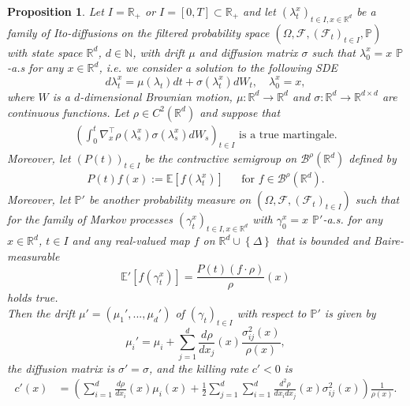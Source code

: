 \documentclass[a4paper,12pt]{article}
\newtheorem{proposition}[theorem]{Proposition}
\theoremstyle{definition}
\theoremstyle{remark}
\numberwithin{equation}{section}
\numberwithin{theorem}{section}
\begin{document}
\begin{proposition}
\label{prop:measure change gFs for Ito diffusions} Let $I=\mathbb{R}_{+}$
or $I=\left[ 0,T\right] \subset \mathbb{R}_{+}$ and let
$\left(\lambda_{t}^{x}\right)_{t\in I,x\in \mathbb{R}^{d}}$ be a family of Ito-diffusions on the filtered probability space $ \left(\Omega,\mathcal{F},\left(\mathcal{F}_{t}\right)_{t\in I},\mathbb{P}\right) $ with state space $\mathbb{R}^{d}$, $d\in\mathbb{N}$, with drift $\mu$ and diffusion matrix $\sigma$  such that $\lambda_{0}^{x}=x$
$\mathbb{P}$-a.s for any $x\in \mathbb{R}^{d}$, i.e. we consider a solution to the following SDE
\[
d\lambda_t^x= \mu(\lambda_t) dt + \sigma(\lambda_t^x) dW_t, \quad \lambda_0^x= x,
\]
where $W$ is a $d$-dimensional Brownian motion, $\mu: \mathbb{R}^d \to \mathbb{R}^d$ and $\sigma: \mathbb{R}^d \to \mathbb{R}^{d \times d}$ are continuous functions.
Let $\rho\in C^{2}(\mathbb{R}^{d})$ and suppose that
 \begin{align}\label{eq:martingale}
\left(\int_0^t  \nabla_x^{\top} \rho(\lambda_s^x) \sigma(\lambda_s^x) dW_s\right)_{t \in I} \text{ is a true martingale.}
 \end{align}
Moreover, let
$\left(P(t)\right)_{t\in I}$ be the contractive semigroup  on $\mathcal{\mathscr{B}}^{\rho}(\mathbb{R}^{d})$ defined by
\begin{eqnarray}
P(t)f(x):=\mathbb{E}\left[f(\lambda_{t}^{x})\right] & & \text{for  } f\in\mathcal{\mathscr{B}}^{\rho}(\mathbb{R}^{d}).
\end{eqnarray}
Moreover, let $\mathbb{P}'$ be another probability
measure on
$
\left(\Omega,\mathcal{F},\left(\mathcal{F}_{t}\right)_{t\in I}\right)
$
such that for the family of Markov processes $\left(\gamma_{t}^{x}\right)_{t\in I,x\in \mathbb{R}^{d}}$
with $\gamma_{0}^{x}=x$ $\mathbb{P}'$-a.s. for any $x\in \mathbb{R}^{d}$, $t\in I$ and any real-valued map
$f$ on $\mathbb{R}^{d}\cup\left\{ \Delta\right\} $ that is bounded and Baire-measurable  \\
\[
\mathbb{E}'\left[f(\gamma_{t}^{x})\right]=\frac{P\left(t\right)\left(f\cdot\rho\right)}{\rho}(x)
\]
holds true.\\
Then the drift $\mu'=\left(\mu_{1}',...,\mu_{d}'\right)$ of $\left(\gamma_{t}\right)_{t\in I}$
with respect to $\mathbb{P}'$ is given by 
\[
\mu_{i}'=\mu_{i}+{\sum}_{j=1}^{d}\frac{d\rho}{dx_{j}}(x)\frac{\sigma_{ij}^{2}(x)}{\rho(x)},
\]
the diffusion matrix is $\sigma'=\sigma$, and the killing rate $c'<0$
is
\begin{align*}
c'(x) & =\left({\sum}_{i=1}^{d}\frac{d\rho}{dx_{i}}(x)\mu_{i}(x)+\frac{1}{2}{\sum}_{j=1}^{d}{\sum}_{i=1}^{d}\frac{d^{2}\rho}{dx_{i}dx_{j}}(x)\sigma_{ij}^{2}(x)\right)\frac{1}{\rho(x)}.
\end{align*}
\end{proposition}
\end{document}
